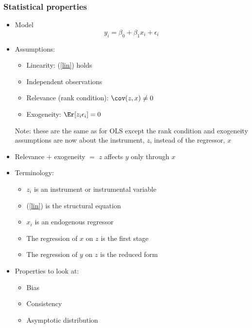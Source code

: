 \begin{frame}[allowframebreaks] 
  \frametitle{Statistical properties}
  \begin{itemize}
  \item Model
    \begin{equation}
      y_i = \beta_0 + \beta_1 x_i + \epsilon_i \label{lin}
    \end{equation}
  \item Assumptions:
    \begin{itemize}
    \item[IV.1] Linearity: (\ref{lin}) holds
    \item[IV.2] Independent observations
    \item[IV.3] Relevance (rank condition): $\cov(z,x) \neq 0$
    \item[IV.4] Exogeneity: $\Er[z_i \epsilon_i ] = 0$
    \end{itemize}
    Note: these are the same as for OLS except the rank condition and
    exogeneity assumptions are now about the instrument, $z$, instead of
    the regressor, $x$
  \item Relevance $+$ exogeneity $=$ $z$ affects $y$ only through $x$
  \item Terminology:
    \begin{itemize}
    \item $z_i$ is an \alert{instrument} or \alert{instrumental
        variable}
    \item (\ref{lin}) is the \alert{structural equation}
    \item $x_i$ is an \alert{endogenous regressor}
    \item The regression of $x$ on $z$ is the \alert{first stage} 
    \item The regression of $y$ on $z$ is the \alert{reduced form}
    \end{itemize}
  \item Properties to look at:
    \begin{itemize}
    \item Bias
    \item Consistency
    \item Asymptotic distribution
    \end{itemize}
  \end{itemize}
\end{frame}

